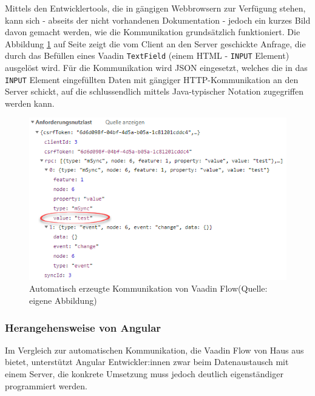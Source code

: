\documentclass[a4paper,12pt,twoside]{scrreprt}
\begin{document}
\medskip

Mittels den Entwicklertools, die in gängigen Webbrowsern zur Verfügung stehen, kann sich - abseits der nicht vorhandenen Dokumentation - jedoch ein kurzes Bild davon gemacht werden, wie die Kommunikation grundsätzlich funktioniert. Die Abbildung \ref{fig:vaadin-json-communication} auf Seite \pageref{fig:vaadin-json-communication} zeigt die vom Client an den Server geschickte Anfrage, die durch das Befüllen eines Vaadin \texttt{TextField} (einem HTML - \texttt{INPUT} Element) ausgelöst wird. Für die Kommunikation wird \acs{JSON} eingesetzt, welches die in das \texttt{INPUT} Element eingefüllten Daten mit gängiger HTTP-Kommunikation an den Server schickt, auf die schlussendlich mittels Java-typischer Notation zugegriffen werden kann.

\begin{figure}[ht]
    \centering
    \includegraphics[scale=0.75]{images/Vaadin_automated_communicaton-Luidold.png}
    \caption[Automatisch erzeugte Kommunikation von Vaadin Flow]{Automatisch erzeugte Kommunikation von Vaadin Flow\newline(Quelle: eigene Abbildung)}
    \label{fig:vaadin-json-communication}
\end{figure}

\newpage

\subsubsection{Herangehensweise von Angular}
\label{sub-sub-sec:kommunikation-herangehensweise-angular}
Im Vergleich zur automatischen Kommunikation, die Vaadin Flow von Haus aus bietet, unterstützt Angular Entwickler:innen zwar beim Datenaustausch mit einem Server, die konkrete Umsetzung muss jedoch deutlich eigenständiger programmiert werden.
\end{document}
